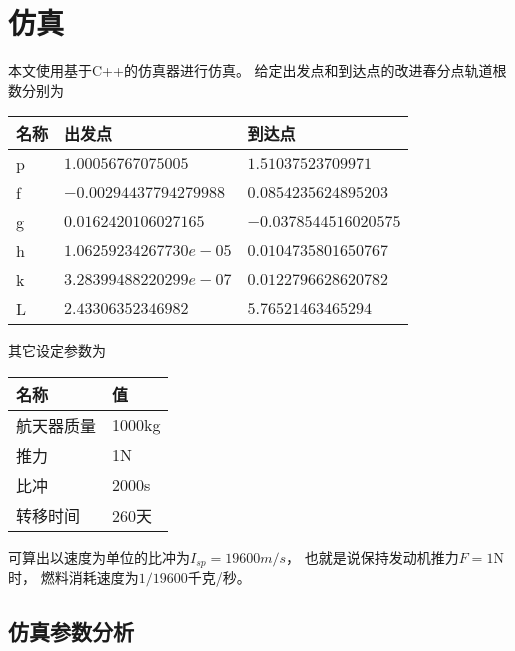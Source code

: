 \section{仿真}
本文使用基于C++的仿真器\cite{olzhn2021}进行仿真。
给定出发点和到达点的改进春分点轨道根数分别为
\begin{center}\begin{tabular}{lll}
    \toprule
    名称 & 出发点 & 到达点 \\
    \midrule
    p & $1.00056767075005     $ & $1.51037523709971    $ \\
    f & $-0.00294437794279988 $ & $0.0854235624895203  $ \\
    g & $0.0162420106027165   $ & $-0.0378544516020575 $ \\
    h & $1.06259234267730e-05 $ & $0.0104735801650767  $ \\
    k & $3.28399488220299e-07 $ & $0.0122796628620782  $ \\
    L & $2.43306352346982     $ & $5.76521463465294    $ \\
    \bottomrule
\end{tabular}\end{center}
其它设定参数为
\begin{center}\begin{tabular}{ll}
    \toprule
    名称 & 值 \\
    \midrule
    航天器质量 & 1000kg \\
    推力 & 1N \\
    比冲 & 2000s \\
    转移时间 & 260天 \\
    \bottomrule
\end{tabular}\end{center}
可算出以速度为单位的比冲为$I_{sp}=19600m/s$，
也就是说保持发动机推力$F=1$N时，
燃料消耗速度为$1/19600$千克/秒。

\subsection{仿真参数分析}
